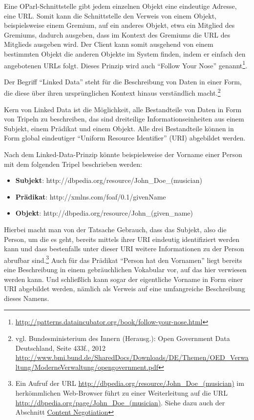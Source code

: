 \documentclass[,a4paper]{article}
\begin{document}
Eine OParl-Schnittstelle gibt jedem einzelnen Objekt eine eindeutige
Adresse, eine URL. Somit kann die Schnittstelle den Verweis von einem
Objekt, beispielsweise einem Gremium, auf ein anderes Objekt, etwa ein
Mitglied des Gremiums, dadurch ausgeben, dass im Kontext des Gremiums
die URL des Mitglieds ausgeben wird. Der Client kann somit ausgehend von
einem bestimmten Objekt die anderen Objekte im System finden, indem er
einfach den angebotenen URLs folgt. Dieses Prinzip wird auch ``Follow
Your Nose'' genannt\footnote{\url{http://patterns.dataincubator.org/book/follow-your-nose.html}}.


Der Begriff ``Linked Data'' steht für die Beschreibung von Daten in
einer Form, die diese über ihren ursprünglichen Kontext hinaus
verständlich macht.\footnote{vgl. Bundesministerium des Innern
  (Herausg.): Open Government Data Deutschland, Seite 433f., 2012
  \url{http://www.bmi.bund.de/SharedDocs/Downloads/DE/Themen/OED_Verwaltung/ModerneVerwaltung/opengovernment.pdf}}

Kern von Linked Data ist die Möglichkeit, alle Bestandteile von Daten in
Form von Tripeln zu beschreiben, das sind dreiteilige
Informationseinheiten aus einem Subjekt, einem Prädikat und einem
Objekt. Alle drei Bestandteile können in Form global eindeutiger
``Uniform Resource Identifier'' (URI) abgebildet werden.

Nach dem Linked-Data-Prinzip könnte beispielsweise der Vorname einer
Person mit dem folgenden Tripel beschrieben werden:

\begin{itemize}
\itemsep1pt\parskip0pt
\item
  \textbf{Subjekt}: http://dbpedia.org/resource/John\_Doe\_(musician)
\item
  \textbf{Prädikat}: http://xmlns.com/foaf/0.1/givenName
\item
  \textbf{Objekt}: http://dbpedia.org/resource/John\_(given\_name)
\end{itemize}

Hierbei macht man von der Tatsache Gebrauch, dass das Subjekt, also die
Person, um die es geht, bereits mittels ihrer URI eindeutig
identifiziert werden kann und dass bestenfalls unter dieser URI weitere
Informationen zu der Person abrufbar sind.\footnote{Ein Aufruf der URL
  \url{http://dbpedia.org/resource/John_Doe_(musician)} im herkömmlichen
  Web-Browser führt zu einer Weiterleitung auf die URL
  \url{http://dbpedia.org/page/John_Doe_(musician)}. Siehe dazu auch der
  Abschnitt \hyperref[contentux5fnegotiation]{Content Negotiation}} Auch
für das Prädikat ``Person hat den Vornamen'' liegt bereits eine
Beschreibung in einem gebräuchlichen Vokabular vor, auf das hier
verwiesen werden kann. Und schließlich kann sogar der eigentliche
Vorname in Form einer URI abgebildet werden, nämlich als Verweis auf
eine umfangreiche Beschreibung dieses Namens.
\end{document}
